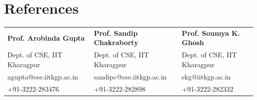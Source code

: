 \section{References}
\begin{small}
\noindent\begin{tabular}{lll}
\textbf{Prof. Arobinda Gupta} & \textbf{Prof. Sandip Chakraborty} & \textbf{Prof. Soumya K. Ghosh} \\
Dept. of CSE, IIT Kharagpur & Dept. of CSE, IIT Kharagpur & Dept. of CSE, IIT Kharagpur \\
agupta@cse.iitkgp.ac.in & sandipc@cse.iitkgp.ac.in & skg@iitkgp.ac.in \\
+91-3222-283476 & +91-3222-282898 & +91-3222-282332 \\
\end{tabular}
\end{small}






\halfblankline